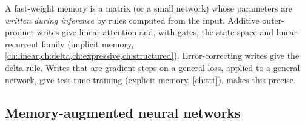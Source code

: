 \begin{keyidea}[title={Key idea: fast weights are the common ancestor}]
A fast-weight memory is a matrix (or a small network) whose parameters are \emph{written during
inference} by rules computed from the input. Additive outer-product writes give linear attention
and, with gates, the state-space and linear-recurrent family (implicit memory,
\cref{ch:linear,ch:delta,ch:expressive,ch:structured}). Error-correcting writes give the delta
rule. Writes that are gradient steps on a general loss, applied to a general network, give
test-time training (explicit memory, \cref{ch:ttt}).  makes this precise.
\end{keyidea}

\subsection{Memory-augmented neural networks}\label{sec:c02-mann}


